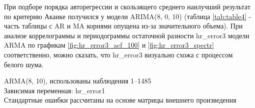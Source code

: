 \documentclass[a4paper,12pt]{article}
\begin{document}
При подборе порядка авторегрессии и скользящего среднего наилучший результат по критерию Акаике получился у модели ARIMA(8, 0, 10) (таблица \ref{tab:table4} - часть таблицы с AR и MA корнями опущена из-за значительного объема). При анализе коррелограммы и периодограммы остаточной разности hr\_error3 модели ARMA по графикам \ref{fig:hr_error3_acf_100} и \ref{fig:hr_error3_spectr} соответственно, можно сказать, что hr\_error3 визуально схожа с процессом белого шума.

\begin{table}[H]
\begin{center}
	
	ARMA(8, 10), использованы наблюдения 1--1485\\
	Зависимая переменная: hr\_error1\\
	Стандартные ошибки рассчитаны на основе матрицы внешнего произведения
	
	\vspace{1em}
	

\end{center}
\end{table}
\end{document}
